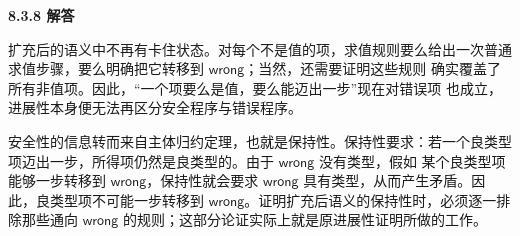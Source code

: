\begin{taplauthorsolutionentrybox}
\label{sol:author:8.3.8}
\textbf{8.3.8 解答}

扩充后的语义中不再有卡住状态。对每个不是值的项，求值规则要么给出一次普通
求值步骤，要么明确把它转移到 \(\mathsf{wrong}\)；当然，还需要证明这些规则
确实覆盖了所有非值项。因此，“一个项要么是值，要么能迈出一步”现在对错误项
也成立，进展性本身便无法再区分安全程序与错误程序。

安全性的信息转而来自主体归约定理，也就是保持性。保持性要求：若一个良类型
项迈出一步，所得项仍然是良类型的。由于 \(\mathsf{wrong}\) 没有类型，假如
某个良类型项能够一步转移到 \(\mathsf{wrong}\)，保持性就会要求
\(\mathsf{wrong}\) 具有类型，从而产生矛盾。因此，良类型项不可能一步转移到
\(\mathsf{wrong}\)。证明扩充后语义的保持性时，必须逐一排除那些通向
\(\mathsf{wrong}\) 的规则；这部分论证实际上就是原进展性证明所做的工作。

\end{taplauthorsolutionentrybox}
